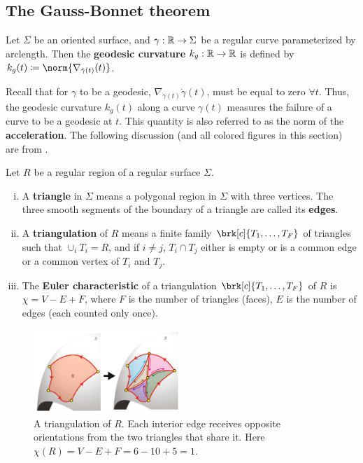 \subsection{The Gauss-Bonnet theorem}
\begin{definition}[]\label{}
Let $\Sigma$ be an oriented surface, and $\gamma: \mathbb{R} \to \Sigma$ be a regular curve parameterized by arclength. Then the \textbf{geodesic curvature} $k_g:\mathbb{R} \to \mathbb{R}$ is defined by $k_g(t) \defn \norm{\nabla_{\dot{\gamma}(t)}(t)}$.
\end{definition}
Recall that for $\gamma$ to be a geodesic, $\nabla_{\dot{\gamma}(t)}\dot{\gamma}(t)$, must be equal to zero $\forall t$. Thus, the geodesic curvature $k_g(t)$ along a curve $\gamma(t)$ measures the failure of a curve to be a geodesic at $t$. This quantity is also referred to as the norm of the \textbf{acceleration}.
%
The following discussion (and all colored figures in this section) are from \cite{tapp2016differential}.
\begin{definition}[]\label{}
Let $R$ be a regular region of a regular surface $\Sigma$.
\begin{enumerate}[i)]
\item A \textbf{triangle} in $\Sigma$ means a polygonal region in $\Sigma$ with three vertices. The three smooth segments of the boundary of a triangle are called its \textbf{edges}.
\item A \textbf{triangulation} of $R$ means a finite family $\brk[c]{T_1, \ldots, T_F}$ of triangles such that $\cup_i T_i = R$, and if $i \neq j$, $T_i \cap T_j$ either is empty or is a common edge or a common vertex of $T_i$ and $T_j$.
\item The \textbf{Euler characteristic} of a triangulation $\brk[c]{T_1, \ldots, T_F}$ of $R$ is $\chi = V - E + F$, where $F$ is the number of triangles (faces), $E$ is the number of edges (each counted only once).
\end{enumerate}
\end{definition}
\begin{figure}[!htb]
	\centering
	\includegraphics[width=0.5\textwidth]{img/triangulation.png}
	\caption{A triangulation of $R$. Each interior edge receives opposite orientations from the two triangles that share it. Here $\chi(R) = V - E + F = 6 - 10 + 5 = 1$.}
	\label{}
\end{figure}

